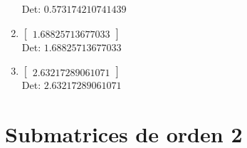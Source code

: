 \documentclass[12pt]{article}
\begin{document}
\begin{enumerate}
Det: $0.573174210741439$\\

\item $\displaystyle \left[\begin{matrix}1.68825713677033\end{matrix}\right]$\\

Det: $1.68825713677033$\\

\item $\displaystyle \left[\begin{matrix}2.63217289061071\end{matrix}\right]$\\

Det: $2.63217289061071$\\

\end{enumerate}


\section*{Submatrices de orden 2}
\end{document}
